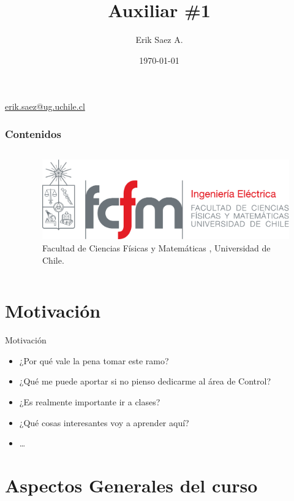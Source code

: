 \documentclass[
    10pt,
    aspectratio=169,
    xcolor={dvipsnames},
    spanish,
    ]{beamer}
\title[Auxiliar \#1]{\bfseries Auxiliar \#1}
\subtitle{}
\author[Erik Saez A.]{Erik Saez A.}
\institute[UChile]{Department of Electrical Engineering \\ Universidad de Chile}
\date{\today}
\begin{document}
\begin{frame}
  \titlepage
  \centering
   \href{mailto:erik.saez@ug.uchile.cl}{erik.saez@ug.uchile.cl} \hspace{.2cm}
\end{frame}

\begin{frame}
  \frametitle{Contenidos}
  \centering
  \begin{columns}
    \begin{column}{0.4\textwidth}
      \tableofcontents
    \end{column}
    \begin{column}{0.5\textwidth}
      \begin{figure}
        \centering
        \includegraphics[width=\textwidth]{fcfm_die}
        \caption{Facultad de Ciencias Físicas y Matemáticas , Universidad de Chile.}
      \end{figure}
    \end{column}
  \end{columns}  
\end{frame}

\section{Motivación}
\begin{frame}{Motivación}
  \begin{itemize}
    \item ¿Por qué vale la pena tomar este ramo?
    \item ¿Qué me puede aportar si no pienso dedicarme al área de Control?
    \item ¿Es realmente importante ir a clases? 
    \item ¿Qué cosas interesantes voy a aprender aquí?
    \item \dots
  \end{itemize}
\end{frame}
\section{Aspectos Generales del curso}
\end{document}

